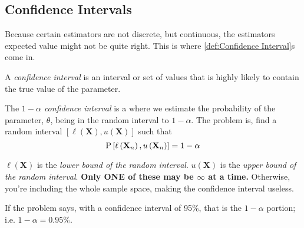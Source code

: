	\subsection{Confidence Intervals} \label{subsec:Confidence Interval}
	Because certain estimators are not discrete, but continuous, the estimators expected value might not be quite right.
	This is where \ref{def:Confidence Interval}s come in.
		\begin{definition} \label{def:Confidence Interval}
			A \emph{confidence interval} is an interval or set of values that is highly likely to contain the true value of the parameter.
		\end{definition}
		\begin{definition} \label{def:1-alpha Confidence Interval}
			The \emph{$1-\alpha$ confidence interval} is a  where we estimate the probability of the parameter, $\theta$, being in the random interval to $1-\alpha$.
			The problem is, find a random interval $\left[ \ell \left( \mathbf{X} \right), u \left( \mathbf{X} \right) \right]$ such that
			\begin{equation} \label{eq:1-alpha Confidence Interval}
				\operatorname{P} \left[ \ell \left( \mathbf{X}_{n} \right) , u \left( \mathbf{X}_{n} \right) \right] = 1-\alpha
			\end{equation}
			\begin{remark}
				$\ell \left( \mathbf{X} \right)$ is the \emph{lower bound of the random interval}.
				$u \left( \mathbf{X} \right)$ is the \emph{upper bound of the random interval}.
				\textbf{Only ONE of these may be $\infty$ at a time.} Otherwise, you're including the whole sample space, making the confidence interval useless.
			\end{remark}
			\begin{remark}
				If the problem says, with a confidence interval of 95\%, that is the $1-\alpha$ portion; i.e. $1-\alpha = 0.95 \%$.
			\end{remark}
		\end{definition}
	
